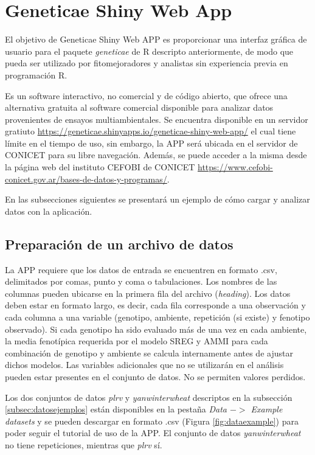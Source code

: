 \section{Geneticae Shiny Web App}

El objetivo de Geneticae Shiny Web APP es proporcionar una interfaz gráfica de usuario para el paquete \emph{geneticae} de R descripto anteriormente, de modo que pueda ser utilizado por fitomejoradores y analistas sin experiencia previa en programación R. 

Es un software interactivo, no comercial y de código abierto, que ofrece una alternativa gratuita al software comercial disponible para analizar datos provenientes de ensayos multiambientales. Se encuentra disponible en un servidor gratiuto \url{https://geneticae.shinyapps.io/geneticae-shiny-web-app/} el cual tiene límite en el tiempo de uso, sin embargo, la APP será ubicada en el servidor de CONICET para su libre navegación. Además, se puede acceder a la misma desde la página web del instituto CEFOBI de CONICET \url{https://www.cefobi-conicet.gov.ar/bases-de-datos-y-programas/}.

En las subsecciones siguientes se presentará un ejemplo de cómo cargar y analizar datos con la aplicación.


\subsection{Preparación de un archivo de datos}

La APP requiere que los datos de entrada se encuentren en formato .csv, delimitados por comas, punto y coma o tabulaciones. Los nombres de las columnas pueden ubicarse en la primera fila del archivo (\emph{heading}). Los datos deben estar en formato largo, es decir, cada fila corresponde a una observación y cada columna a una variable (genotipo, ambiente, repetición (si existe) y fenotipo observado). Si cada genotipo ha sido evaluado más de una vez en cada ambiente, la media fenotípica requerida por el modelo SREG y AMMI para cada combinación de genotipo y ambiente se calcula internamente antes de ajustar dichos modelos. Las variables adicionales que no se utilizarán en el análisis pueden estar presentes en el conjunto de datos. No se permiten valores perdidos.

Los dos conjuntos de datos \emph{plrv} y \emph{yanwinterwheat} descriptos en la subsección \ref{subsec:datosejemplos} están disponibles en la pestaña \emph{Data $->$ Example datasets} y se pueden descargar en formato .csv (Figura \ref{fig:dataexample}) para poder seguir el tutorial de uso de la APP. El conjunto de datos \emph{yanwinterwheat} no tiene repeticiones, mientras que \emph{plrv} sí. 

